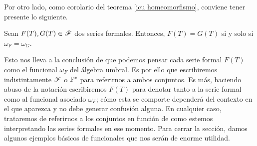 Por otro lado, como corolario del teorema \ref{icu homeomorfismo}, conviene tener presente lo siguiente.

\begin{corolario}
    Sean $F(T), G(T) \in \mathscr{F}$ dos series formales. Entonces, $F(T) = G(T) $ si y solo si $\omega_F = \omega_G$.
\end{corolario}

Esto nos lleva a la conclusión de que podemos pensar cada serie formal $F(T)$ como el funcional $\omega_F$ del álgebra umbral. Es por ello que escribiremos indistintamente $\mathscr{F}$ o $\mathbb{P}^*$ para referirnos a ambos conjuntos. Es más, haciendo abuso de la notación escribiremos $F(T)$ para denotar tanto a la serie formal como al funcional asociado $\omega_F$; cómo esta se comporte dependerá del contexto en el que aparezca y no debe generar confusión alguna. En cualquier caso, trataremos de referirnos a los conjuntos en función de como estemos interpretando las series formales en ese momento. Para cerrar la sección, damos algunos ejemplos básicos de funcionales que nos serán de enorme utilidad. 
